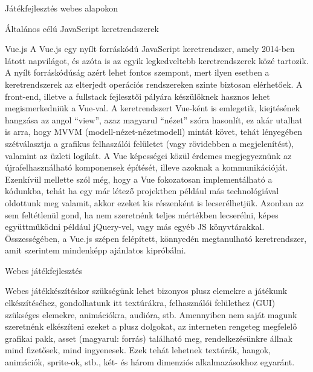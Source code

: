 \begin{MyChapter}{Játékfejlesztés webes alapokon}
\begin{MySection}{Általános célú JavaScript keretrendszerek}
		\begin{MySubSection}{Vue.js}
			A Vue.js egy nyílt forráskódú JavaScript keretrendszer, amely 2014-ben látott napvilágot, és azóta is az egyik legkedveltebb keretrendszerek közé tartozik. A nyílt forráskódúság azért lehet fontos szempont, mert ilyen esetben a keretrendszerek az elterjedt operációs rendszereken szinte biztosan elérhetőek. A front-end, illetve a fullstack fejlesztői pályára készülőknek hasznos lehet megismerkedniük a Vue-val.
			\cite{js_framework}
			A keretrendszert Vue-ként is emlegetik, kiejtésének hangzása az angol ``view'', azaz magyarul ``nézet'' szóra hasonlít, ez akár utalhat is arra, hogy MVVM (modell-nézet-nézetmodell) mintát követ, tehát lényegében szétválasztja a grafikus felhaszálói felületet (vagy rövidebben a megjelenítést), valamint az üzleti logikát.
			A Vue képességei közül érdemes megjegyeznünk az újrafelhasználható komponensek építését, illeve azoknak a kommunikációját.
			\cite{vue_bevezetes}
			\cite{vue_pros_cons}
			Ezenkívül mellette szól még, hogy a Vue fokozatosan implementálható a kódunkba, tehát ha egy már létező projektben például más technológiával oldottunk meg valamit, akkor ezeket kis részenként is lecserélhetjük. Azonban az sem feltétlenül gond, ha nem szeretnénk teljes mértékben lecserélni, képes együttműködni például jQuery-vel, vagy más egyéb JS könyvtárakkal.
			Összességében, a Vue.js szépen felépített, könnyedén megtanulható keretrendszer, amit szerintem mindenképp ajánlatos kipróbálni.
			\cite{vue_alapozo}
		\end{MySubSection}
	\end{MySection}

	\begin{MySection}{Webes játékfejlesztés}
		
		Webes játékkészítéskor szükségünk lehet bizonyos plusz elemekre a játékunk elkészítéséhez, gondolhatunk itt textúrákra, felhasználói felülethez (GUI) szükséges elemekre, animációkra, audióra, stb. Amennyiben nem saját magunk szeretnénk elkészíteni ezeket a plusz dolgokat, az interneten rengeteg megfelelő grafikai pakk, asset (magyarul: forrás) található meg, rendelkezésünkre állnak mind fizetősek, mind ingyenesek. Ezek tehát lehetnek textúrák, hangok, animációk, sprite-ok, stb., két- és három dimenziós alkalmazásokhoz egyaránt. 
		

\end{MySection}
\end{MyChapter}
